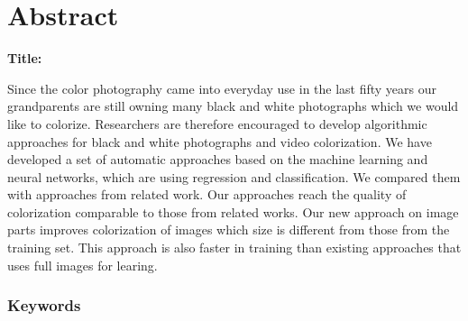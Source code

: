 \chapter*{Abstract}

\noindent\textbf{Title:} \ttitleEn
\bigskip

Since the color photography came into everyday use in the last fifty years our grandparents are still owning many black and white photographs which we would like to colorize. Researchers are therefore encouraged to develop algorithmic approaches for black and white photographs and video colorization.  
We have developed a set of automatic approaches based on the machine learning and neural networks, which are using regression and classification. We compared them with approaches from related work.  
Our approaches reach the quality of colorization comparable to those from related works. Our new approach on image parts improves colorization of images which size is different from those from the training set. This approach is also faster in training than existing approaches that uses full images for learing.


\subsection*{Keywords}
\textit{\tkeywordsEn}
\clearemptydoublepage